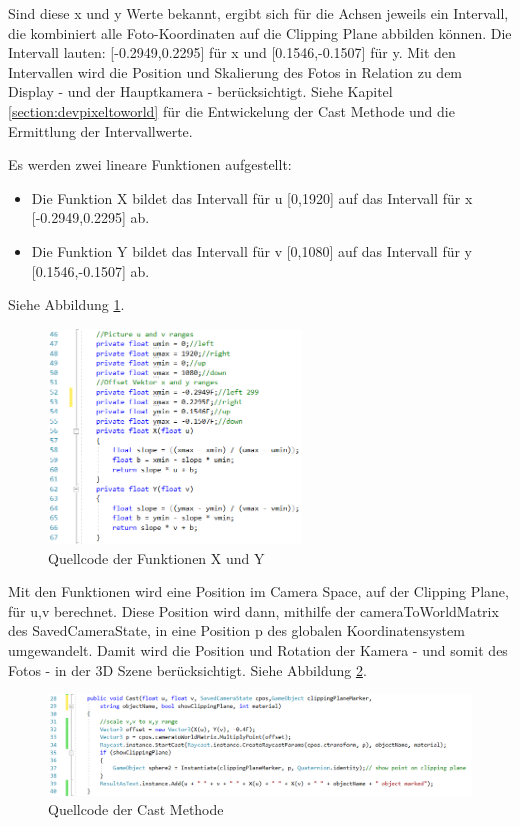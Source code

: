 Sind diese x und y Werte bekannt, ergibt sich für die Achsen jeweils ein Intervall, die kombiniert alle Foto-Koordinaten auf die Clipping Plane abbilden können. Die Intervall lauten: [-0.2949,0.2295] für x und [0.1546,-0.1507] für y. Mit den Intervallen wird die Position und Skalierung des Fotos in Relation zu dem Display - und der Hauptkamera - berücksichtigt. Siehe Kapitel \ref{section:devpixeltoworld} für die Entwickelung der Cast Methode und die Ermittlung der Intervallwerte.

Es werden zwei lineare Funktionen aufgestellt:
\begin{itemize}
	\item Die Funktion X bildet das Intervall für u [0,1920] auf das Intervall für x [-0.2949,0.2295] ab.
	\item Die Funktion Y bildet das Intervall für v [0,1080] auf das Intervall für y [0.1546,-0.1507] ab.
\end{itemize}
Siehe Abbildung \ref{code:uvtoxy}.
\begin{figure}[H]
	\centering
	\includegraphics[width=0.6\textwidth]{images/code_uv_to_xy_scale.PNG}
	\caption[Quellcode der Funktionen X und Y]{Quellcode der Funktionen X und Y}
	\label{code:uvtoxy}
\end{figure}

Mit den Funktionen wird eine Position im Camera Space, auf der Clipping Plane, für u,v berechnet. Diese Position wird dann, mithilfe der cameraToWorldMatrix des SavedCameraState, in eine Position p des globalen Koordinatensystem umgewandelt. Damit wird die Position und Rotation der Kamera - und somit des Fotos - in der 3D Szene berücksichtigt. Siehe Abbildung \ref{code:castmethod}.

\begin{figure}[H]
	\centering
	\includegraphics[width=1.2\textwidth]{images/code_cast_method.PNG}
	\caption[Quellcode der Cast Methode]{Quellcode der Cast Methode}
	\label{code:castmethod}
\end{figure}
